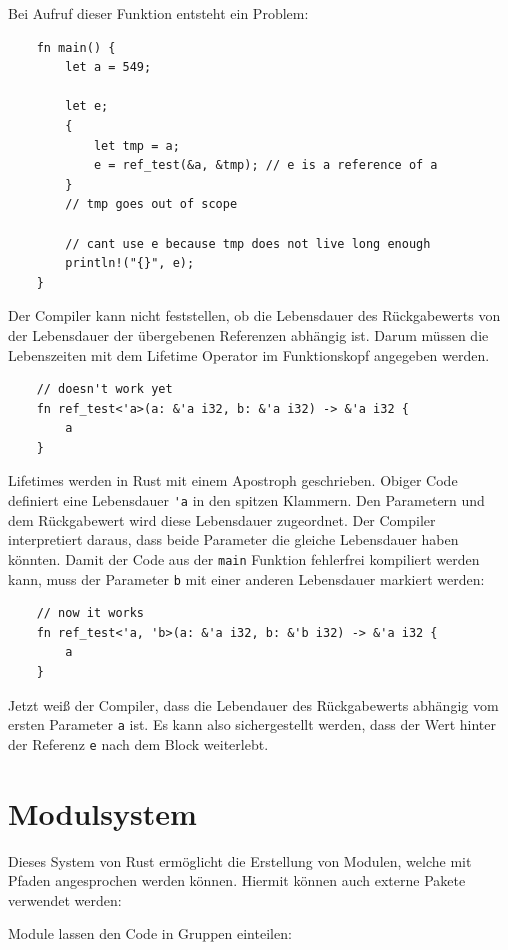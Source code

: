 Bei Aufruf dieser Funktion entsteht ein Problem:

\begin{lstlisting}
    fn main() {
        let a = 549;

        let e;
        {
            let tmp = a;
            e = ref_test(&a, &tmp); // e is a reference of a
        }
        // tmp goes out of scope

        // cant use e because tmp does not live long enough
        println!("{}", e);
    }
\end{lstlisting}

Der Compiler kann nicht feststellen, ob die Lebensdauer des Rückgabewerts von der Lebensdauer der übergebenen Referenzen abhängig ist. Darum müssen die Lebenszeiten mit dem Lifetime Operator im Funktionskopf angegeben werden.

\begin{lstlisting}
    // doesn't work yet
    fn ref_test<'a>(a: &'a i32, b: &'a i32) -> &'a i32 {
        a
    }
\end{lstlisting}

Lifetimes werden in Rust mit einem Apostroph geschrieben. Obiger Code de\-fi\-niert eine Lebensdauer \verb"'a" in den spitzen Klammern. Den Parametern und dem Rückgabewert wird diese Lebensdauer zugeordnet. Der Compiler interpretiert daraus, dass beide Parameter die gleiche Lebensdauer haben könnten. Damit der Code aus der \verb"main" Funktion fehlerfrei kompiliert werden kann, muss der Parameter \verb"b" mit einer anderen Lebensdauer markiert werden:

\begin{lstlisting}
    // now it works
    fn ref_test<'a, 'b>(a: &'a i32, b: &'b i32) -> &'a i32 {
        a
    }
\end{lstlisting}

Jetzt weiß der Compiler, dass die Lebendauer des Rückgabewerts abhängig vom ersten Parameter \verb"a" ist. Es kann also sichergestellt werden, dass der Wert hinter der Referenz \verb"e" nach dem Block weiterlebt.

\section{Modulsystem}

Dieses System von Rust ermöglicht die Erstellung von Modulen, welche mit Pfaden angesprochen werden können. Hiermit können auch externe Pakete verwendet werden:

Module lassen den Code in Gruppen einteilen:

